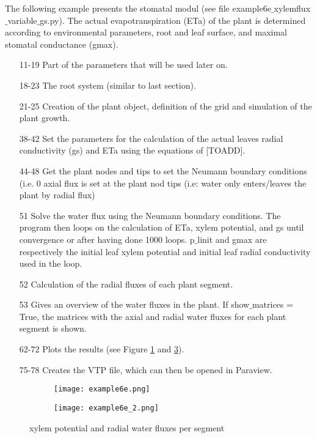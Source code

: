 The following example presents the stomatal modul (see file example6e$\_$xylemflux$\_$variable$\_$gs.py). The actual evapotranspiration (ETa) of the plant is determined according to environmental parameters, root and leaf surface, and maximal stomatal conductance (gmax). 
%
\begin{itemize}

\item[11-19] Part of the parameters that will be used later on.

\item[18-23] The root system (similar to last section). 

\item[21-25] Creation of the plant object, definition of the grid and simulation of the plant growth.

\item[38-42] Set the parameters for the calculation of the actual leaves radial conductivity (gs) and ETa using the equations of [TOADD].

\item[44-48] Get the plant nodes and tips to set the Neumann boundary conditions (i.e. 0 axial flux is set at the plant nod tips (i.e: water only enters/leaves the plant by radial flux)

\item[51] Solve the water flux using the Neumann boundary conditions. The program then loops on the calculation of ETa, xylem potential, and gs until convergence or after having done 1000 loops. p$\_$linit and gmax are respectively the initial leaf xylem potential and initial leaf radial conductivity used in the loop.

\item[52] Calculation of the radial fluxes of each plant segment.

\item[53] Gives an overview of the water fluxes in the plant. If show$\_$matrices = True, the matrices with the axial and radial water fluxes for each plant segment is shown.

\item[62-72] Plots the results (see Figure \ref{fig:stomata} and \ref{fig:stomatb}).

\item[75-78] Creates the VTP file, which can then be opened in Paraview.

\end{itemize}

\begin{figure}
\begin{subfigure}[c]{0.5\textwidth}
\texttt{[image: example6e.png]}
 \label{fig:stomata}
\end{subfigure}
\begin{subfigure}[c]{0.5\textwidth}
\texttt{[image: example6e\_2.png]}
 \label{fig:stomatb}
\end{subfigure}
\caption{xylem potential and radial water fluxes per segment} 
\end{figure}


